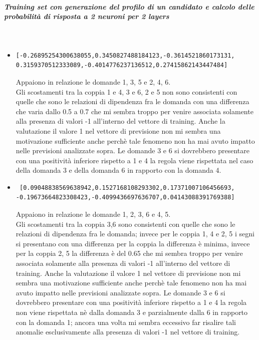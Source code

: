 \documentclass[10pt,a4paper]{article}
\begin{document}
\subparagraph{Training set con generazione del profilo di un candidato e calcolo delle probabilit\`a di risposta a  2 neuroni per 2 layers}\mbox{}
\label{Training set con generazione del profilo di un candidato e calcolo delle probabilita di risposta a  2 neuroni}
\\
\begin{itemize}
\item \begin{verbatim}[-0.26895254300638055,0.3450827488184123,-0.3614521860173131,
0.3159370512333089,-0.4014776237136512,0.27415862143447484]
\end{verbatim}
Appaiono in relazione le domande 1, 3, 5  e 2, 4, 6.\\
Gli scostamenti tra la coppia 1 e 4, 3 e 6, 2 e 5 non sono consistenti con quelle che sono le relazioni di dipendenza fra le domanda con una differenza che varia dallo 0.5 a 0.7 che mi sembra troppo per venire associata solamente alla presenza di valori -1 all'interno del vettore di training. Anche la valutazione il valore 1 nel vettore di previsione non mi sembra una motivazione sufficiente anche perch\`e tale fenomeno non ha mai avuto impatto nelle previsioni analizzate sopra.
Le domande 3 e 6 si dovrebbero presentare con una positivit\`a inferiore rispetto a 1 e 4 la regola viene rispettata nel caso della domanda 3 e della domanda 6 in rapporto con la domanda 4.

\item \begin{verbatim} [0.09048838569638942,0.1527168108293302,0.17371007106456693,
-0.19673664823308423,-0.4099436697636707,0.04143088391769388]
\end{verbatim}
Appaiono in relazione le domande 1, 2, 3, 6 e 4, 5.\\
Gli scostamenti tra la coppia 3,6 sono consistenti con quelle che sono le relazioni di dipendenza fra le domanda;  invece per le coppia 1, 4 e 2, 5 i segni si presentano con una differenza  per la coppia la differenza \`e minima, invece per la coppia 2, 5 la differenza \`e del 0.65 che mi sembra troppo per venire associata solamente alla presenza di valori -1 all'interno del vettore di training. Anche la valutazione il valore 1 nel vettore di previsione non mi sembra una motivazione sufficiente anche perch\`e tale fenomeno non ha mai avuto impatto nelle previsioni analizzate sopra.
Le domande 3 e 6 si dovrebbero presentare con una positivit\`a inferiore rispetto a 1 e 4 la regola non viene rispettata n\`e dalla domanda 3 e parzialmente dalla 6 in rapporto con la domanda 1; ancora una volta mi sembra eccessivo far risalire tali anomalie esclusivamente alla presenza di valori -1 nel vettore di training.


\end{itemize}
\end{document}
